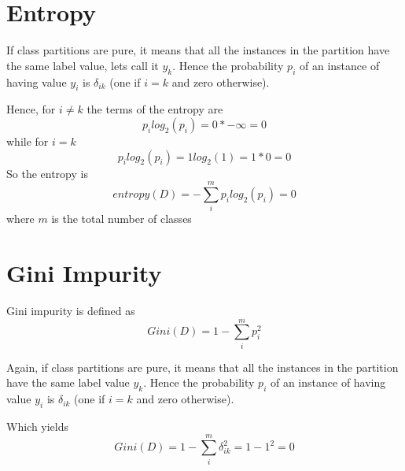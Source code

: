 \documentclass[a4paper]{article}
\begin{document}
\section{Entropy}
If class partitions are pure, it means that all the instances in the partition have the same label value, lets call it $y_k$. Hence the probability $p_i$ of an instance of having value $y_i$ is $\delta_{ik}$ (one if $i=k$ and zero otherwise).

Hence, for $i\ne k$ the terms of the entropy are
$$
    p_i log_{2}{(p_i)} = 0 * -\infty = 0
$$
while for $i = k$
$$
    p_i log_{2}{(p_i)} = 1 log_{2}{(1)} = 1 * 0 = 0
$$
So the entropy is
$$
    entropy(D) = - \sum_{i}^{m} p_i log_{2}{(p_i)} = 0
$$
where $m$ is the total number of classes
\section{Gini Impurity}
Gini impurity is defined as
$$
    Gini(D) = 1 - \sum_{i}^{m} p_{i}^2
$$

Again, if class partitions are pure, it means that all the instances in the partition have the same label value $y_k$. Hence the probability $p_i$ of an instance of having value $y_i$ is $\delta_{ik}$ (one if $i=k$ and zero otherwise).

Which yields
$$
    Gini(D) = 1 - \sum_{i}^{m} \delta_{ik}^2 = 1 - 1^2 = 0
$$
\end{document}

